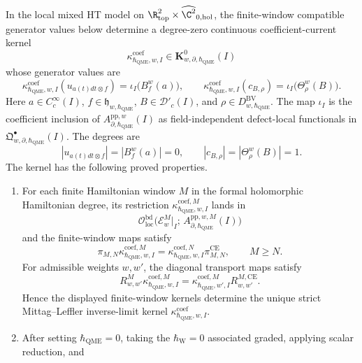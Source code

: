 \begin{prop}
\label{prop:app-bulk-defect-kernel-map}
  In the local mixed HT model on
  \(\R^2_{\mathrm{top}}\times\widehat{\C^2}_{0,\mathrm{hol}}\), the
  finite-window compatible generator values below determine a degree-zero
  continuous coefficient-current kernel
  \[
    \kappa^{\mathrm{coef}}_{\hbar_{\mathrm{QME}},w,I}
      \in \mathbf K^0_{w,\partial,\hbar_{\mathrm{QME}}}(I)
  \]
  whose generator values are
  \[
    \kappa^{\mathrm{coef}}_{\hbar_{\mathrm{QME}},w,I}
      (u_{a(t)dt\otimes f})
      =\iota_I\bigl(B^w_f(a)\bigr),
    \qquad
    \kappa^{\mathrm{coef}}_{\hbar_{\mathrm{QME}},w,I}(c_{B,\rho})
      =\iota_I\bigl(\Theta^w_\rho(B)\bigr).
  \]
  Here
  \(a\in C^\infty_c(I)\), \(f\in\mathfrak h_{w,\hbar_{\mathrm{QME}}}\),
  \(B\in\mathcal D'_c(I)\), and
  \(\rho\in D^{\mathrm{BV}}_{w,\hbar_{\mathrm{QME}}}\).  The map
  \(\iota_I\) is the coefficient inclusion of
  \(A^{\mathrm{pp},w}_{\partial,\hbar_{\mathrm{QME}}}(I)\) as field-independent
  defect-local functionals in
  \(\mathfrak Q^\bullet_{w,\partial,\hbar_{\mathrm{QME}}}(I)\).  The degrees are
  \[
    |u_{a(t)dt\otimes f}|=|B^w_f(a)|=0,\qquad
    |c_{B,\rho}|=|\Theta^w_\rho(B)|=1.
  \]
  The kernel has the following proved properties.
  \begin{enumerate}
    \item For each finite Hamiltonian window \(M\) in the formal
    holomorphic Hamiltonian degree, its restriction
    \(\kappa^{\mathrm{coef},M}_{\hbar_{\mathrm{QME}},w,I}\) lands in
    \[
      \mathcal O_{\mathrm{loc}}^{\mathrm{bd}}\bigl(
        \mathcal E_w^M|_I;\,
        A_{\partial,\hbar_{\mathrm{QME}}}^{\mathrm{pp},w,M}(I)\bigr)
    \]
    and the finite-window maps satisfy
    \[
      \pi_{M,N}\kappa^{\mathrm{coef},M}_{\hbar_{\mathrm{QME}},w,I}
        =
      \kappa^{\mathrm{coef},N}_{\hbar_{\mathrm{QME}},w,I}\pi_{M,N}^{\mathrm{CE}},
      \qquad M\geq N.
    \]
    For admissible weights \(w,w'\), the diagonal transport maps satisfy
    \[
      R^M_{w,w'}\kappa^{\mathrm{coef},M}_{\hbar_{\mathrm{QME}},w,I}
        =
      \kappa^{\mathrm{coef},M}_{\hbar_{\mathrm{QME}},w',I}R^{M,\mathrm{CE}}_{w,w'}.
    \]
    Hence the displayed finite-window kernels determine the unique
    strict Mittag--Leffler inverse-limit kernel
    \(\kappa^{\mathrm{coef}}_{\hbar_{\mathrm{QME}},w,I}\).
	    \item After setting \(\hbar_{\mathrm{QME}}=0\), taking the
	    \(\hbar_{\mathrm{W}}=0\) associated graded, applying scalar reduction, and

\end{enumerate}
\end{prop}
